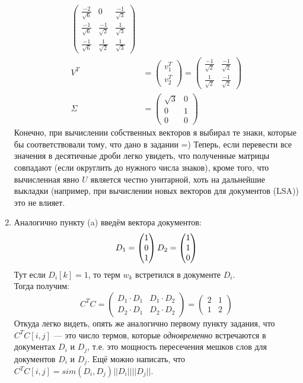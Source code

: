 \begin{solution}
\begin{enumerate}
\begin{align*}
\begin{pmatrix}
	\frac{-2}{\sqrt{6}} & 0 & \frac{-1}{\sqrt{3}} \\
	\frac{-1}{\sqrt{6}} & \frac{-1}{\sqrt{2}} & \frac{1}{\sqrt{3}} \\
	\frac{-1}{\sqrt{6}} & \frac{1}{\sqrt{2}} & \frac{1}{\sqrt{3}}
	\end{pmatrix} \\
	V^T &=
	\begin{pmatrix}
	v_1^T \\
	v_2^T 
	\end{pmatrix}
	=
	\begin{pmatrix}
	\frac{-1}{\sqrt{2}} & \frac{-1}{\sqrt{2}} \\
	\frac{1}{\sqrt{2}} & \frac{-1}{\sqrt{2}}
	\end{pmatrix} \\
	\Sigma &= 
	\begin{pmatrix}
		\sqrt{3} & 0 \\
		0 & 1 \\
		0 & 0
	\end{pmatrix}
	\end{align*}
	Конечно, при вычислении собственных векторов я выбирал те знаки, которые бы соответствовали тому, что дано в задании =)
	Теперь, если перевести все значения в десятичные дроби легко увидеть, что полученные матрицы совпадают (если округлить до нужного числа знаков), кроме того, что вычисленная явно $U$ является честно унитарной, хоть на дальнейшие выкладки (например, при вычислении новых векторов для документов (LSA)) это не влияет.

	\item Аналогично пункту (a) введём вектора документов:
	\begin{align*}
	D_1 = \begin{pmatrix}1 \\ 0 \\ 1\end{pmatrix}
	D_2 = \begin{pmatrix}1 \\ 1 \\ 0\end{pmatrix}
	\end{align*}
	Тут если $D_i[k] = 1$, то терм $w_k$ встретился в документе $D_i$.\\
	Тогда получим:
	\begin{equation*}
	C^TC =
	\begin{pmatrix}
	D_1 \cdot D_1 & D_1 \cdot D_2 \\
	D_2 \cdot D_1 & D_2 \cdot D_2
	\end{pmatrix}
	=
	\begin{pmatrix}
	2 & 1 \\
	1 & 2 
	\end{pmatrix}
	\end{equation*}
	Откуда легко видеть, опять же аналогично первому пункту задания, что $C^TC[i, j]$ --- это число термов, которые \emph{одновременно} встречаются в документах $D_i$ и $D_j$, т.е. это мощность пересечения мешков слов для документов $D_i$ и $D_j$. Ещё можно написать, что $C^TC[i, j] = sim(D_i, D_j) ||D_i|| ||D_j||$.
\end{enumerate}
\end{solution}

